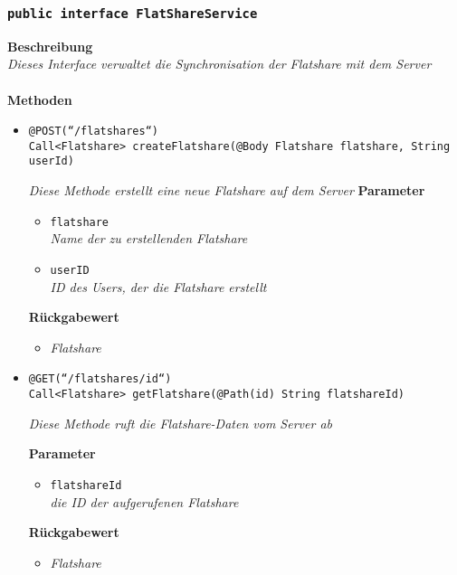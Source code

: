 	\subsubsection{\texttt{public interface FlatShareService }}
	\textbf{Beschreibung}\\
	\textit{Dieses Interface verwaltet die Synchronisation der Flatshare mit dem Server}\\
\\
	\textbf{Methoden} 
		\begin{itemize}
		\item\texttt{{@POST(``/flatshares``) \\
Call<Flatshare> createFlatshare(@Body Flatshare flatshare, String userId)
}}

		\textit{Diese Methode erstellt eine neue Flatshare auf dem Server
}
	\textbf{Parameter} 
			\begin{itemize}
				\item\texttt{flatshare}\\
		 		\textit{Name der zu erstellenden Flatshare}
		 		\item\texttt{userID}\\
		 		\textit{ID des Users, der die Flatshare erstellt}
	 		\end{itemize}

		\textbf{Rückgabewert} 
		\begin{itemize}
		\item\textit{Flatshare}
		\end{itemize}

      \item\texttt{{@GET(``/flatshares/{id}``)\\ Call<Flatshare> getFlatshare(@Path(\grqq id\grqq) 					String flatshareId)}}

		\textit{Diese Methode ruft die Flatshare-Daten vom Server ab}

		\textbf{Parameter} 
			\begin{itemize}
				\item\texttt{flatshareId}\\
		 		\textit{die ID der aufgerufenen Flatshare}
	 		\end{itemize}

		\textbf{Rückgabewert} 
		\begin{itemize}
		\item\textit{Flatshare}
		\end{itemize}

	 \end{itemize}



